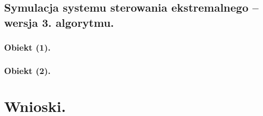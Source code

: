 \documentclass[a4paper,10pt]{article}
\begin{document}



\newpage
\subsection{Symulacja systemu sterowania ekstremalnego – wersja 3. algorytmu.}

\subsubsection{Obiekt (1).}



\subsubsection{Obiekt (2).}
\section{Wnioski.}\label{sec:wnioski}
\end{document}
